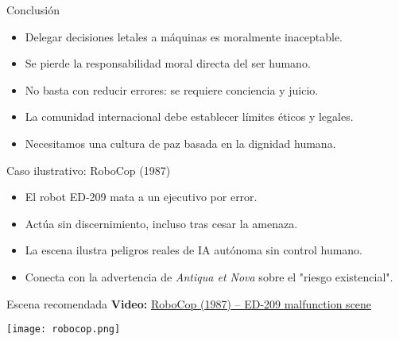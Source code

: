 \documentclass[aspectratio=169]{beamer}
\begin{document}
\begin{frame}{Conclusión}
\begin{itemize}
  \item Delegar decisiones letales a máquinas es moralmente inaceptable.
  \item Se pierde la responsabilidad moral directa del ser humano.
  \item No basta con reducir errores: se requiere conciencia y juicio.
  \item La comunidad internacional debe establecer límites éticos y legales.
  \item Necesitamos una cultura de paz basada en la dignidad humana.
\end{itemize}
\end{frame}

\begin{frame}{Caso ilustrativo: RoboCop (1987)}
\begin{itemize}
  \item El robot ED-209 mata a un ejecutivo por error.
  \item Actúa sin discernimiento, incluso tras cesar la amenaza.
  \item La escena ilustra peligros reales de IA autónoma sin control humano.
  \item Conecta con la advertencia de \textit{Antiqua et Nova} sobre el "riesgo existencial".
\end{itemize}
\end{frame}

\begin{frame}{Escena recomendada}
\textbf{Video:} \href{https://www.youtube.com/watch?v=TYsulVXpgYg}{RoboCop (1987) -- ED-209 malfunction scene}

\texttt{[image: robocop.png]}
\end{frame}
\end{document}
